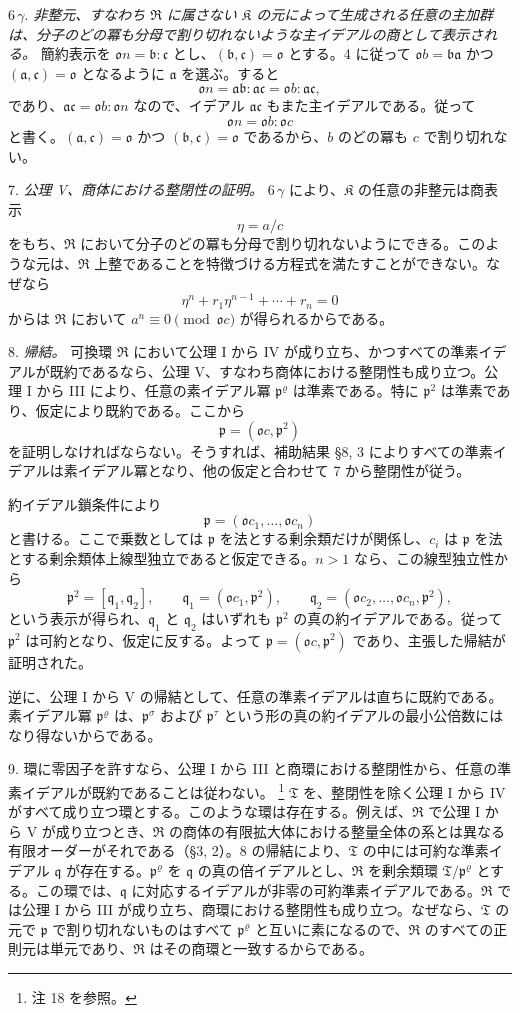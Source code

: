\documentclass[11pt]{article}
\providecommand{\mR}{\mathfrak{R}}
\providecommand{\mK}{\mathfrak{K}}
\providecommand{\mT}{\mathfrak{T}}
\providecommand{\ma}{\mathfrak{a}}
\providecommand{\mb}{\mathfrak{b}}
\providecommand{\mc}{\mathfrak{c}}
\providecommand{\mo}{\mathfrak{o}}
\providecommand{\mpideal}{\mathfrak{p}}
\providecommand{\mq}{\mathfrak{q}}
\begin{document}
6\,$\gamma$. \emph{非整元、すなわち $\mR$ に属さない $\mK$ の元によって生成される任意の主加群は、分子のどの冪も分母で割り切れないような主イデアルの商として表示される。} 簡約表示を $\mo n=\mb:\mc$ とし、$(\mb,\mc)=\mo$ とする。4 に従って $\mo b=\mb\ma$ かつ $(\ma,\mc)=\mo$ となるように $\ma$ を選ぶ。すると
\[
        \mo n=\ma\mb:\ma\mc=\mo b:\ma\mc,
\]
であり、$\ma\mc=\mo b:\mo n$ なので、イデアル $\ma\mc$ もまた主イデアルである。従って
\[
        \mo n=\mo b:\mo c
\]
と書く。$(\ma,\mc)=\mo$ かつ $(\mb,\mc)=\mo$ であるから、$b$ のどの冪も $c$ で割り切れない。

7. \emph{公理 V、商体における整閉性の証明。} 6\,$\gamma$ により、$\mK$ の任意の非整元は商表示
\[
        \eta=a/c
\]
をもち、$\mR$ において分子のどの冪も分母で割り切れないようにできる。このような元は、$\mR$ 上整であることを特徴づける方程式を満たすことができない。なぜなら
\[
        \eta^n+r_1\eta^{n-1}+\cdots+r_n=0
\]
からは $\mR$ において $a^n\equiv0\pmod{\mo c}$ が得られるからである。

8. \emph{帰結。} 可換環 $\mR$ において公理 I から IV が成り立ち、かつすべての準素イデアルが既約であるなら、公理 V、すなわち商体における整閉性も成り立つ。公理 I から III により、任意の素イデアル冪 $\mpideal^\varrho$ は準素である。特に $\mpideal^2$ は準素であり、仮定により既約である。ここから
\[
        \mpideal=(\mo c,\mpideal^2)
\]
を証明しなければならない。そうすれば、補助結果 §8, 3 によりすべての準素イデアルは素イデアル冪となり、他の仮定と合わせて 7 から整閉性が従う。

約イデアル鎖条件により
\[
        \mpideal=(\mo c_1,\ldots,\mo c_n)
\]
と書ける。ここで乗数としては $\mpideal$ を法とする剰余類だけが関係し、$c_i$ は $\mpideal$ を法とする剰余類体上線型独立であると仮定できる。$n>1$ なら、この線型独立性から
\[
        \mpideal^2=[\mq_1,\mq_2],
        \qquad
        \mq_1=(\mo c_1,\mpideal^2),
        \qquad
        \mq_2=(\mo c_2,\ldots,\mo c_n,\mpideal^2),
\]
という表示が得られ、$\mq_1$ と $\mq_2$ はいずれも $\mpideal^2$ の真の約イデアルである。従って $\mpideal^2$ は可約となり、仮定に反する。よって $\mpideal=(\mo c,\mpideal^2)$ であり、主張した帰結が証明された。

逆に、公理 I から V の帰結として、任意の準素イデアルは直ちに既約である。素イデアル冪 $\mpideal^\varrho$ は、$\mpideal^\sigma$ および $\mpideal^\tau$ という形の真の約イデアルの最小公倍数にはなり得ないからである。

9. 環に零因子を許すなら、公理 I から III と商環における整閉性から、任意の準素イデアルが既約であることは従わない。
\footnote{注 18 を参照。}
$\mT$ を、整閉性を除く公理 I から IV がすべて成り立つ環とする。このような環は存在する。例えば、$\mR$ で公理 I から V が成り立つとき、$\mR$ の商体の有限拡大体における整量全体の系とは異なる有限オーダーがそれである（§3, 2）。8 の帰結により、$\mT$ の中には可約な準素イデアル $\mq$ が存在する。$\mpideal^\varrho$ を $\mq$ の真の倍イデアルとし、$\mR$ を剰余類環 $\mT/\mpideal^\varrho$ とする。この環では、$\mq$ に対応するイデアルが非零の可約準素イデアルである。$\mR$ では公理 I から III が成り立ち、商環における整閉性も成り立つ。なぜなら、$\mT$ の元で $\mpideal$ で割り切れないものはすべて $\mpideal^\varrho$ と互いに素になるので、$\mR$ のすべての正則元は単元であり、$\mR$ はその商環と一致するからである。
\end{document}
